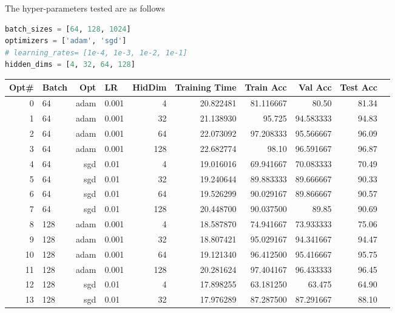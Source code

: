 \begin{solve}
\begin{enumerate}
        The hyper-parameters tested are as follows 
        \begin{lstlisting}[language=python]
batch_sizes = [64, 128, 1024]
optimizers = ['adam', 'sgd']
# learning_rates= [1e-4, 1e-3, 1e-2, 1e-1]
hidden_dims = [4, 32, 64, 128]
        \end{lstlisting}
        
        \begin{table}[H]
            \centering
        \begin{tabular}{rlrlrrrrrr}
            \toprule
            Opt\# & Batch & Opt & LR & HidDim& Training Time & Train Acc & Val Acc & Test Acc \\
            \midrule
            0 & 64 & adam & 0.001& 4 & 20.822481 & 81.116667 & 80.50 & 81.34 \\
            1 & 64 & adam & 0.001& 32 & 21.138930 & 95.725& 94.583333 & 94.83 \\
            2 & 64 & adam & 0.001& 64 & 22.073092 & 97.208333 & 95.566667 & 96.09 \\
            \rowcolor{yellow!50}
            3 & 64 & adam & 0.001& 128 & 22.682774 & 98.10 & 96.591667 & 96.87 \\
            4 & 64 & sgd & 0.01 & 4 & 19.016016 & 69.941667 & 70.083333 & 70.49 \\
            5 & 64 & sgd & 0.01 & 32 & 19.240644 & 89.883333 & 89.666667 & 90.33 \\
            6 & 64 & sgd & 0.01 & 64 & 19.526299 & 90.029167 & 89.866667 & 90.57 \\
            \rowcolor{orange!50}
            7 & 64 & sgd & 0.01 & 128 & 20.448700 & 90.037500 & 89.85 & 90.69 \\
            8 & 128 & adam & 0.001& 4 & 18.587870 & 74.941667 & 73.933333 & 75.06 \\
            9 & 128 & adam & 0.001& 32 & 18.807421 & 95.029167 & 94.341667 & 94.47 \\
            10 & 128 & adam & 0.001& 64 & 19.121340 & 96.412500 & 95.416667 & 95.75 \\
            \rowcolor{yellow!50}
            11 & 128 & adam & 0.001& 128 & 20.281624 & 97.404167 & 96.433333 & 96.45 \\            
            12 & 128 & sgd & 0.01 & 4 & 17.898255 & 63.181250 & 63.475& 64.90 \\
            13 & 128 & sgd & 0.01 & 32 & 17.976289 & 87.287500 & 87.291667 & 88.10 \\

\end{tabular}
\end{table}
\end{enumerate}
\end{solve}
